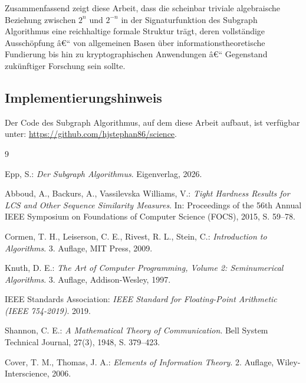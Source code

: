 ﻿\documentclass[a4paper,12pt]{article}
\theoremstyle{definition}
\begin{document}
Zusammenfassend zeigt diese Arbeit, dass die scheinbar triviale
algebraische Beziehung zwischen $2^n$ und $2^{-n}$ in der Signaturfunktion
des Subgraph Algorithmus eine reichhaltige formale Struktur trägt, deren
vollständige Ausschöpfung â€“ von allgemeinen Basen über
informationstheoretische Fundierung bis hin zu kryptographischen
Anwendungen â€“ Gegenstand zukünftiger Forschung sein sollte.

\subsection{Implementierungshinweis}

Der Code des Subgraph Algorithmus, auf dem diese Arbeit aufbaut, ist
verfügbar unter: \url{https://github.com/hjstephan86/science}.

\begin{thebibliography}{9}

Epp, S.: \emph{Der Subgraph Algorithmus}. Eigenverlag, 2026.

Abboud, A., Backurs, A., Vassilevska Williams, V.:
\emph{Tight Hardness Results for LCS and Other Sequence Similarity Measures}.
In: Proceedings of the 56th Annual IEEE Symposium on Foundations of
Computer Science (FOCS), 2015, S. 59--78.

Cormen, T. H., Leiserson, C. E., Rivest, R. L., Stein, C.:
\emph{Introduction to Algorithms}. 3. Auflage, MIT Press, 2009.

Knuth, D. E.: \emph{The Art of Computer Programming, Volume 2:
Seminumerical Algorithms}. 3. Auflage, Addison-Wesley, 1997.

IEEE Standards Association: \emph{IEEE Standard for Floating-Point
Arithmetic (IEEE 754-2019)}. 2019.

Shannon, C. E.: \emph{A Mathematical Theory of Communication}.
Bell System Technical Journal, 27(3), 1948, S. 379--423.

Cover, T. M., Thomas, J. A.: \emph{Elements of Information Theory}.
2. Auflage, Wiley-Interscience, 2006.

\end{thebibliography}
\end{document}
